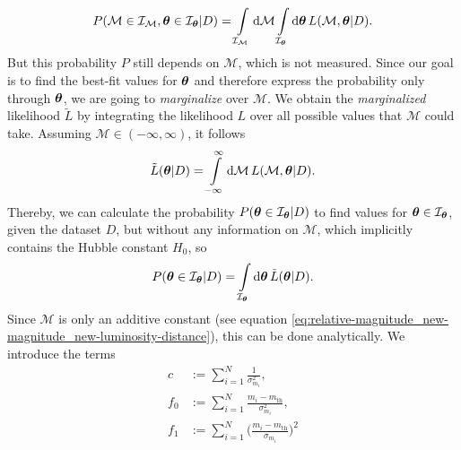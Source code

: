 \begin{align}
    P(\mathcal{M} \in \mathcal{I}_{\mathcal{M}}, \vb*{\theta} \in \mathcal{I}_{\vb*{\theta}} \vert D) = \int\limits_{\mathcal{I}_{\mathcal{M}}} \dd{\mathcal{M}} \int\limits_{\mathcal{I}_{\vb*\theta}} \dd{\vb*{\theta}} L(\mathcal{M}, \vb*{\theta} \vert D). \label{eq:probability}   
\end{align}
But this probability $P$ still depends on $\mathcal{M}$, which is not measured. Since our goal is to find the best-fit values for $\vb*{\theta}$ and therefore express the probability only through $\vb*{\theta}$, we are going to \textit{marginalize} over $\mathcal{M}$. We obtain the \textit{marginalized} likelihood $\tilde{L}$ by integrating the likelihood $L$ over all possible values that $\mathcal{M}$ could take. Assuming $\mathcal{M} \in (-\infty, \infty)$, it follows  
\begin{align}
    \tilde{L}(\vb*{\theta} \vert D) = \int\limits_{-\infty}^{\infty} \dd{\mathcal{M}} L(\mathcal{M}, \vb*{\theta} \vert D). \label{eq:marginalized-likelihood} 
\end{align}
Thereby, we can calculate the probability $P(\vb*{\theta} \in \mathcal{I}_{\vb*{\theta}} \vert D)$ to find values for $\vb*{\theta} \in \mathcal{I}_{\vb*{\theta}}$, given the dataset $D$, but without any information on $\mathcal{M}$, which implicitly contains the Hubble constant $H_{0}$, so
\begin{align}
    P(\vb*{\theta} \in \mathcal{I}_{\vb*{\theta}} \vert D) = \int\limits_{\mathcal{I}_{\vb*{\theta}}} \dd{\vb*{\theta}} \tilde{L}(\vb*{\theta} \vert D). \label{eq:marginalized-probability}
\end{align}
Since $\mathcal{M}$ is only an additive constant (see equation \eqref{eq:relative-magnitude_new-magnitude_new-luminosity-distance}), this can be done analytically. We introduce the terms
\begin{align}
    c &:= \sum_{i = 1}^{N} \frac{1}{\sigma_{m_{i}}^2}, \\
    f_{0} &:= \sum_{i = 1}^{N} \frac{m_{i} - m_{\text{th}}}{\sigma_{m_{i}}^2}, \\
    f_{1} &:= \sum_{i = 1}^{N} \biggr(\frac{m_{i} - m_{\text{th}}}{\sigma_{m_{i}}} \biggl)^2
\end{align}

